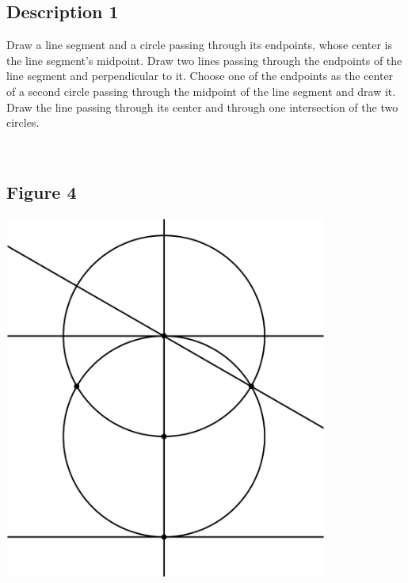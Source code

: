 \documentclass[12pt,a4paper,article,english,firamath]{nsi}
\begin{document}
\maketitle

\subsection*{Description 1}
{\brettley 

Draw a line segment and a circle passing through its endpoints, whose center is the line segment's midpoint.
Draw two lines passing through the endpoints of the line segment and perpendicular to it. Choose one of the endpoints as the center of a second circle passing through the midpoint of the line segment and draw it.
Draw the line passing through its center and through one intersection of the two circles.}\\[1em]



\subsection*{Figure 4}
\begin{center}
    \includegraphics[height=12cm]{img/fig01.png}
\end{center}
\end{document}
